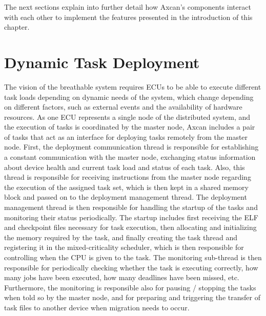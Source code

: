 The next sections explain into further detail how Axcan's components interact with each other to implement the features presented in the introduction of this chapter.

\section{Dynamic Task Deployment}
The vision of the breathable system requires ECUs to be able to execute different task loads depending on dynamic needs of the system, which change depending on different factors, such as external events and the availability of hardware resources. As one ECU represents a single node of the distributed system, and the execution of tasks is coordinated by the master node, Axcan includes a pair of tasks that act as an interface for deploying tasks remotely from the master node. First, the deployment communication thread is responsible for establishing a constant communication with the master node, exchanging status information about device health and current task load and status of each task. Also, this thread is responsible for receiving instructions from the master node regarding the execution of the assigned task set, which is then kept in a shared memory block and passed on to the deployment management thread. The deployment management thread is then responsible for handling the startup of the tasks and monitoring their status periodically. The startup includes first receiving the ELF and checkpoint files necessary for task execution, then allocating and initializing the memory required by the task, and finally creating the task thread and registering it in the mixed-criticality scheduler, which is then responsible for controlling when the CPU is given to the task. The monitoring sub-thread is then responsible for periodically checking whether the task is executing correctly, how many jobs have been executed, how many deadlines have been missed, etc. Furthermore, the monitoring is responsible also for pausing / stopping the tasks when told so by the master node, and for preparing and triggering the transfer of task files to another device when migration needs to occur.

